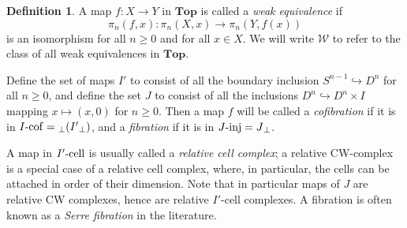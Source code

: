 \documentclass{amsart}
\theoremstyle{plain}
\theoremstyle{definition}
\newtheorem{definition}[theorem]{Definition}
\newcommand{\Top}{\mbf{Top}}
\newcommand{\sseq}{\subseteq}
\newcommand{\0}{\mathbf{0}}
\newcommand{\p}{{_\perp}}
\newcommand{\into}{\hookrightarrow}
\newcommand{\cW}{\mathcal W}
\newcommand{\mbf}[1]{\mathbf{#1}}
\renewcommand{\(}{\left(}
\renewcommand{\)}{\right)}
\newcommand{\inj}{\text-\mathrm{inj}}
\newcommand{\cell}{\text-\mathrm{cell}}
\newcommand{\cof}{\text-\mathrm{cof}}
\begin{document}
\begin{definition}
  A map $f:X\to Y$ in $\Top$ is called a \textit{weak equivalence} if
  \[\pi_n(f,x):\pi_n(X,x)\to\pi_n(Y,f(x))\]
  is an isomorphism for all $n\geq0$ and for all $x\in X$. We will write $\cW$ to refer to the class of all weak equivalences in $\Top$.

  Define the set of maps $I'$ to consist of all the boundary inclusion $S^{n-1}\into D^n$ for all $n\geq0$, and define the set $J$ to consist of all the inclusions $D^n\into D^n\times I$ mapping $x\mapsto(x,0)$ for $n\geq0$. Then a map $f$ will be called a \textit{cofibration} if it is in $I\cof={\p( I'\p )}$, and a \textit{fibration} if it is in $J\inj=J\p$.

  A map in $I'\cell$ is usually called a \textit{relative cell complex}; a relative CW-complex is a special case of a relative cell complex, where, in particular, the cells can be attached in order of their dimension. Note that in particular maps of $J$ are relative CW complexes, hence are relative $I'$-cell complexes. 
  A fibration is often known as a \textit{Serre fibration} in the literature.
\end{definition}
\end{document}
